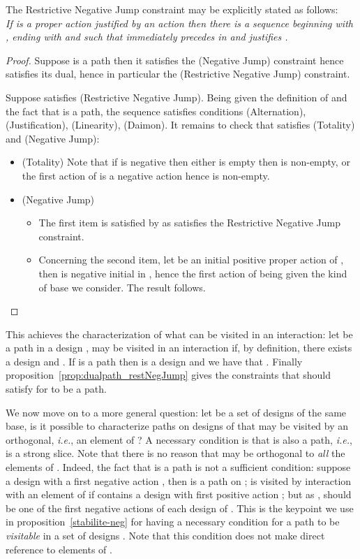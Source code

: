\documentclass{LMCS}
\def\ie{{\em i.e.}}
\begin{document}
\noindent The Restrictive Negative Jump constraint may be explicitly stated as follows:\\
{\em If   is a proper action justified by an
action  then there is a sequence
  beginning with
, ending with  and such that
 immediately precedes  in  and
 justifies .}

\begin{proof}
Suppose  is a path then it satisfies the (Negative
Jump) constraint hence  satisfies its dual, hence in
particular the (Restrictive Negative Jump) constraint.

Suppose  satisfies (Restrictive Negative Jump). Being given the definition of  and the fact that  is a path, the sequence  satisfies conditions (Alternation), (Justification), (Linearity), (Daimon). It remains to check that  satisfies (Totality) and (Negative Jump):
\begin{itemize}
\item (Totality) Note that if  is negative then either  is empty then  is non-empty, or the first action of  is a negative action hence  is non-empty.
\item (Negative Jump)
\begin{itemize}
\item The first item is satisfied by  as  satisfies the Restrictive Negative Jump constraint.
\item Concerning the second item, let  be an initial positive proper action of , then  is negative initial in , hence the first action of  being given the kind of base we consider. The result follows.\qedhere
\end{itemize}
\end{itemize}
\end{proof}

\noindent This achieves the characterization of what can be visited in an interaction: let  be a path in a design ,  may be visited in an interaction if, by definition, there exists a design  and . If  is a path then  is a design and we have that . Finally proposition~\ref{prop:dualpath_restNegJump} gives the constraints that  should satisfy for  to be a path.

We now move on to a more general question: let  be a set of designs of the same base, is it possible to characterize paths  on designs of  that may be visited by an orthogonal, \ie, an element of ? A necessary condition is that  is also a path, \ie,  is a strong slice. Note that there is no reason that  may be orthogonal to {\em all} the elements of . Indeed, the fact that  is a path is not a sufficient condition: suppose a design  with a first negative action , then  is a path on ;  is visited by interaction with an element  of  if  contains a design with first positive action ; but as ,  should be one of the first negative actions of each design of . 
This is the keypoint we use in proposition~\ref{stabilite-neg} for 
having a necessary condition for a path to be
 {\em visitable} in a set of designs . Note that this 
condition
 does not make direct reference to elements of .
\end{document}
